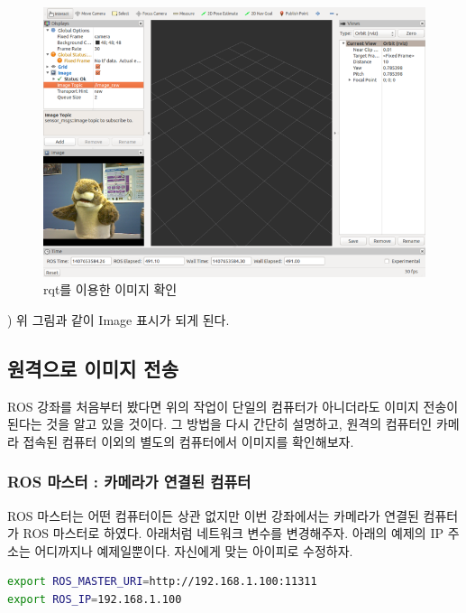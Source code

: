 \begin{figure}[h]
\centering\includegraphics[width=0.9\columnwidth]{pictures/chapter9/rqt_image_full.png}
\caption{rqt를 이용한 이미지 확인}
\end{figure}

\vspace{\baselineskip}
\noindent
{}) 위 그림과 같이 Image 표시가 되게 된다.

\subsection{원격으로 이미지 전송}

ROS 강좌를 처음부터 봤다면 위의 작업이 단일의 컴퓨터가 아니더라도 이미지 전송이 된다는 것을 알고 있을 것이다. 그 방법을 다시 간단히 설명하고, 원격의 컴퓨터인 카메라 접속된 컴퓨터 이외의 별도의 컴퓨터에서 이미지를 확인해보자.

\subsubsection{ROS 마스터 : 카메라가 연결된 컴퓨터}

ROS 마스터는 어떤 컴퓨터이든 상관 없지만 이번 강좌에서는 카메라가 연결된 컴퓨터가 ROS 마스터로 하였다. 아래처럼 네트워크 변수를 변경해주자. 아래의 예제의 IP 주소는 어디까지나 예제일뿐이다. 자신에게 맞는 아이피로 수정하자.

\begin{lstlisting}[language=bash]
export ROS_MASTER_URI=http://192.168.1.100:11311 
export ROS_IP=192.168.1.100
\end{lstlisting}

